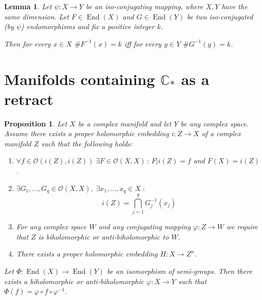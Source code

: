 \documentclass[a4paper,12pt]{amsart}
\newcommand{\CC}{\mathbb{C}}
\newcommand{\holo}{\mathcal{O}}
\DeclareMathOperator{\enmo}{End}
\newtheorem{lemma}[theorem]{Lemma}
\newtheorem{proposition}[theorem]{Proposition}
\theoremstyle{definition}
\begin{document}
\begin{lemma}
    Let $\psi \colon X\to Y$ be an iso-conjugating mapping, where $X,Y$ have the same dimension. Let $F\in\enmo(X)$ and $G\in\enmo(Y)$ be two iso-conjugated (by $\psi$) endomorphisms and fix a positive integer $k$. 
    
    Then for every $x\in X$ $\#F^{-1}(x)=k$ iff for every $y\in Y$ $\#G^{-1}(y)=k$.
\end{lemma}

\section{Manifolds containing $\CC_\ast$ as a retract}

\begin{proposition}
\label{prop-key}
Let $X$ be a complex manifold and let $Y$ be any complex space. 
Assume there exists a proper holomorphic embedding $i \colon Z \to X$ of a complex manifold $Z$ such that the following holds:
\begin{enumerate}
\item \label{property1} $\forall f \in \holo(i(Z), i(Z)) \; \exists F \in \holo(X, X) \,:\, F|i(Z) = f$ and $F(X) = i(Z)$.
\item \label{property2} $\exists G_1, \dots, G_q \in \holo(X, X), \; \exists x_1, \dots, x_q \in X \;:$
\[i(Z) = \bigcap_{j=1}^{q} G_j^{-1}(x_j)\]
\item \label{property3} For any complex space $W$ and any conjugating mapping $\varphi \colon Z \to W$ we require that $Z$ is biholomorphic or anti-biholomorphic to $W$.
\item \label{property4} There exists a proper holomorphic embedding $H \colon X \to Z^n$.
\end{enumerate}
Let $\Phi \colon \enmo(X) \to \enmo(Y)$ be an isomorphism of semi-groups. Then there exists a biholomorphic or anti-biholomorphic $\varphi \colon X \to Y$ such that $\Phi(f) = \varphi \circ f \circ \varphi^{-1}$. 
\end{proposition}
\end{document}
